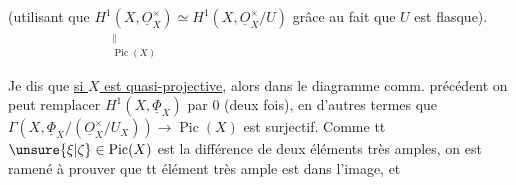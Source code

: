 
(utilisant que $\underset{\substack{\parallel\\\operatorname{Pic}(X)}}{H^1(X,\underline O_X^{\times})}\simeq H^1(X,\underline O_X^{\times}/U)$ grâce au fait que $U$ est flasque).

Je dis que \uline{si $X$ est quasi-projective}, alors dans le diagramme comm. précédent on peut remplacer $H^1(X,\underline{\Phi}_X)$ par 0 (deux fois), en d'autres termes que $\Gamma(X,\underline{\Phi}_X/(\underline O_X^{\times}/U_X))\to\operatorname{Pic}(X)$ est surjectif. Comme tt $\unsure{\xi|\zeta}\in\operatorname{Pic}(X)$ est la différence de deux éléments très amples, on est ramené à prouver que tt élément très ample est dans l'image, et
